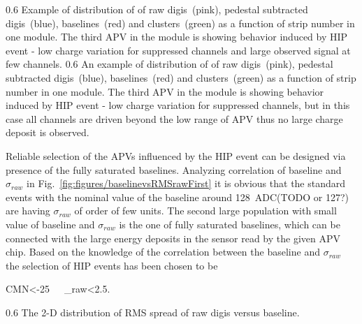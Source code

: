                  {0.6}       %
                 {Example of distribution of of raw digis~(pink), pedestal subtracted digis~(blue), baselines~(red) and clusters~(green) as a function of strip number in one module. The third APV in the module is showing behavior induced by HIP event - low charge variation for suppressed channels and large observed signal at few channels. } %
                 {0.6}       %
                 {An example of distribution of of raw digis~(pink), pedestal subtracted digis~(blue), baselines~(red) and clusters~(green) as a function of strip number in one module. The third APV in the module is showing behavior induced by HIP event - low charge variation for suppressed channels, but in this case all channels are driven beyond the low range of APV thus no large charge deposit is observed. } %

Reliable selection of the APVs influenced by the HIP event can be designed via presence of the fully saturated baselines. Analyzing correlation of baseline and $\sigma_{raw}$ in Fig.~\ref{fig:figures/baselinevsRMSrawFirst} it is obvious that the standard events with the nominal value of the baseline around 128~ADC(TODO or 127?) are having $\sigma_{raw}$ of order of few units. The second large population with small value of baseline and $\sigma_{raw}$ is the one of fully saturated baselines, which can be connected with the large energy deposits in the sensor read by the given APV chip. Based on the knowledge of the correlation between the baseline and $\sigma_{raw}$ the selection of HIP events has been chosen to be 

{
CMN<-25~~~\sigma_{raw}<2.5.
}

                 {0.6}       %
                 {The 2-D distribution of RMS spread of raw digis versus baseline. } %

